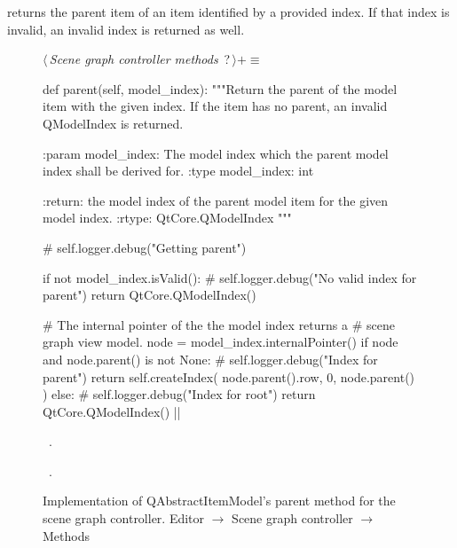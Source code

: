 \documentclass[%
    a4paper,    %
    justified,  %
    nobib,      %
    openany     %
]{tufte-book}
\makeatletter
\renewcommand{\label}[1]{\@tufte@label{##1}}%
\makeatother
\begin{document}
 returns the parent item of an item identified by
a provided index. If that index is invalid, an invalid index is returned as
well.

\begin{figure}
\begin{flushleft} \small
\begin{minipage}{\linewidth}\label{scrap32}\raggedright\small
{} $\langle\,${\itshape Scene graph controller methods}\nobreak\ {\footnotesize {?}}$\,\rangle+\equiv$
\vspace{-1ex}
\begin{pythoncode}
def parent(self, model_index):
    """Return the parent of the model item with the given index.
    If the item has no parent, an invalid QModelIndex is returned.

    :param model_index: The model index which the parent model
                        index shall be derived for.
    :type model_index:  int

    :return: the model index of the parent model item for the
             given model index.
    :rtype:  QtCore.QModelIndex
    """

    # self.logger.debug("Getting parent")

    if not model_index.isValid():
        # self.logger.debug("No valid index for parent")
        return QtCore.QModelIndex()

    # The internal pointer of the the model index returns a
    # scene graph view model.
    node = model_index.internalPointer()
    if node and node.parent() is not None:
        # self.logger.debug("Index for parent")
        return self.createIndex(
            node.parent().row, 0, node.parent()
        )
    else:
        # self.logger.debug("Index for root")
        return QtCore.QModelIndex()
|\NWsep|
\end{pythoncode}
\vspace{1.5ex}
\footnotesize
\begin{list}{}{\setlength{\itemsep}{-\parsep}\setlength{\itemindent}{-\leftmargin}}
\item \NWtxtMacroDefBy\ .
\item \NWtxtMacroRefIn\ .

\item{}
\end{list}
\end{minipage}\vspace{4ex}
\end{flushleft}
\caption{Implementation of QAbstractItemModel's parent method for the scene graph
  controller.
  \newline{}\newline{}Editor $\rightarrow$ Scene graph controller $\rightarrow$
  Methods}
\label{editor:lst:scene-graph-controller:methods:parent}
\end{figure}
\end{document}
